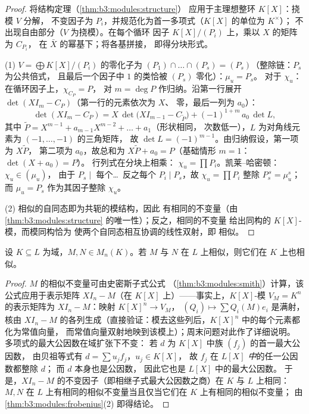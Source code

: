 \begin{proof}
将结构定理（\cref{thm:b3:modules:structure}）
应用于主理想整环 $K[X]$：挠模 $V$ 分解，
不变因子为 $P_i$，并规范化为首一多项式（$K[X]$ 的单位为 $K^\times$）；
不出现自由部分（$V$ 为挠模）。在每个循环
因子 $K[X]/(P_i)$ 上，乘以 $X$ 的矩阵为 $C_{P_i}$，
在 $\bar X$ 的幂基下；将各基拼接，
即得分块形式。

(1) $V = \bigoplus K[X]/(P_i)$ 的零化子为 $(P_1)\cap
\dots\cap(P_s) = (P_s)$（整除链：$P_s$ 为公共倍式，
且最后一个因子中 $1$ 的类恰被 $(P_s)$ 零化）：$\mu_u = P_s$。
对于 $\chi_u$：在循环因子上，$\chi_{C_P} = P$，
对 $m = \deg P$ 作归纳。沿第一行展开
$\det(XI_m - C_P)$（第一行的元素依次为 $X$、
零，最后一列为 $a_0$）：
\[
\det(XI_m - C_P) = X\,\det\bigl(XI_{m-1} - C_{\tilde P}\bigr)
+ (-1)^{1+m}\,a_0\,\det L ,
\]
其中 $\tilde P = X^{m-1} + a_{m-1}X^{m-2} + \dots + a_1$（形状相同，
次数低一），$L$ 为对角线元素为 $(-1, \dots, -1)$ 的三角矩阵，
故 $\det L = (-1)^{m-1}$。由归纳假设，第一项为 $X\tilde P$，
第二项为 $a_0$，故总和为
$X\tilde P + a_0 = P$（基础情形 $m=1$：$\det(X + a_0) = P$）。
行列式在分块上相乘：
$\chi_u = \prod P_i$。凯莱–哈密顿：$\chi_u \in (\mu_u)$，
由于 $P_s \mid$ 每个\dots\ 反之每个 $P_i \mid P_s$，故
$\chi_u = \prod P_i$ 整除 $P_s^{\,s} = \mu_u^s$；而 $\mu_u =
P_s$ 作为其因子整除 $\chi_u$。

(2) 相似的自同态即为共轭的模结构，因此
有相同的不变量（由
\cref{thm:b3:modules:structure} 的唯一性）；反之，相同的不变量
给出同构的 $K[X]$-模，而模同构恰为
使两个自同态相互协调的线性双射，即
相似。
\end{proof}

\begin{corollary}[相似性对域扩张不敏感]
\label{cor:b3:modules:descent}
设 $K \subseteq L$ 为域，$M, N \in M_n(K)$。若 $M$ 与
$N$ 在 $L$ 上相似，则它们在 $K$ 上也相似。
\end{corollary}

\begin{proof}
$M$ 的相似不变量可由史密斯子式公式
（\cref{thm:b3:modules:smith}）计算，该公式应用于表示矩阵
$XI_n - M$（在 $K[X]$ 上）——事实上，$K[X]$-模
$V_M = K^n$ 的表示矩阵为 $XI_n - M$：映射 $K[X]^n \to V_M$，
$(Q_i) \mapsto \sum Q_i(M)e_i$ 是满射，核由
$XI_n - M$ 的各列生成（直接验证：模去这些列后，$K[X]^n$ 中的每个元素都化为常值向量，
而常值向量双射地映到该模上）；周末问题对此作了详细说明。
多项式的最大公因数在域扩张下不变：
若 $d$ 为 $K[X]$ 中族 $(f_j)$ 的首一最大公因数，
由贝祖等式有 $d = \sum u_jf_j$，$u_j \in K[X]$，
故 $f_j$ 在 \emph{$L[X]$ 中}的任一公因数都整除 $d$；
而 $d$ 本身也是公因数，
因此它也是 $L[X]$ 中的最大公因数。
于是，$XI_n - M$ 的不变因子（即相继子式最大公因数之商）在
$K$ 与 $L$ 上相同：
$M, N$ 在 $L$ 上有相同的相似不变量当且仅当它们在 $K$ 上有相同的相似不变量；
由\cref{thm:b3:modules:frobenius}(2) 即得结论。
\end{proof}

